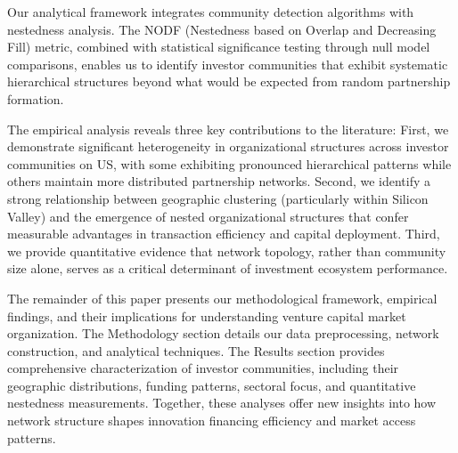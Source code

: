 Our analytical framework integrates community detection algorithms with nestedness analysis. The NODF (Nestedness based on Overlap and Decreasing Fill) metric, combined with statistical significance testing through null model comparisons, enables us to identify investor communities that exhibit systematic hierarchical structures beyond what would be expected from random partnership formation.

The empirical analysis reveals three key contributions to the literature: First, we demonstrate significant heterogeneity in organizational structures across investor communities on US, with some exhibiting pronounced hierarchical patterns while others maintain more distributed partnership networks. Second, we identify a strong relationship between geographic clustering (particularly within Silicon Valley) and the emergence of nested organizational structures that confer measurable advantages in transaction efficiency and capital deployment. Third, we provide quantitative evidence that network topology, rather than community size alone, serves as a critical determinant of investment ecosystem performance.

The remainder of this paper presents our methodological framework, empirical findings, and their implications for understanding venture capital market organization. The Methodology section details our data preprocessing, network construction, and analytical techniques. The Results section provides comprehensive characterization of investor communities, including their geographic distributions, funding patterns, sectoral focus, and quantitative nestedness measurements. Together, these analyses offer new insights into how network structure shapes innovation financing efficiency and market access patterns.